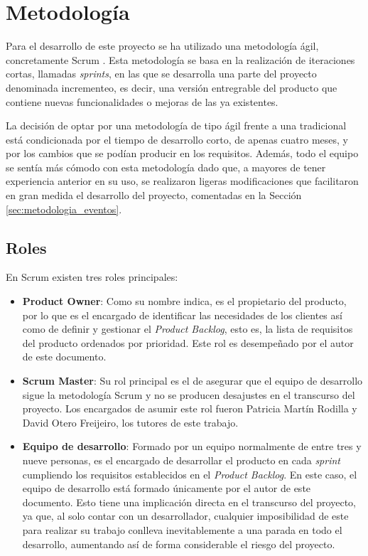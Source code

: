 \chapter{Metodología}
\label{chap:metodologia}

Para el desarrollo de este proyecto se ha utilizado una metodología ágil, concretamente Scrum \cite{scrum}.
Esta metodología se basa en la realización de iteraciones cortas, llamadas \textit{sprints}, en las que se desarrolla una parte del proyecto
denominada incrementeo, es decir, una versión entregrable del producto que contiene
nuevas funcionalidades o mejoras de las ya existentes. 

\bigskip
La decisión de optar por una metodología de tipo ágil frente a una tradicional
está condicionada por el tiempo de desarrollo corto, de apenas cuatro meses, y por los cambios que se podían producir en los requisitos.
Además, todo el equipo se sentía más cómodo con esta metodología dado que, a mayores de tener experiencia anterior en su uso, se realizaron
ligeras modificaciones que facilitaron en gran medida el desarrollo del proyecto, comentadas en la Sección \ref{sec:metodologia_eventos}.

\section{Roles}
\label{sec:metodologia_roles}

En Scrum existen tres roles principales:

\begin{itemize}
		\item \textbf{Product Owner}: Como su nombre indica, es el propietario del producto, por lo que es el encargado de identificar
		las necesidades de los clientes así como de definir y gestionar el \textit{Product Backlog}, esto es, la lista de requisitos del producto ordenados por prioridad.
		Este rol es desempeñado por el autor de este documento.
		\item \textbf{Scrum Master}: Su rol principal es el de asegurar que el equipo de desarrollo sigue la metodología Scrum y no se producen
		desajustes en el transcurso del proyecto. Los encargados de asumir este rol fueron Patricia Martín Rodilla y David Otero Freijeiro, los
		tutores de este trabajo.
		\item \textbf{Equipo de desarrollo}: Formado por un equipo normalmente de entre tres y nueve personas, es el encargado de desarrollar el producto
		en cada \textit{sprint} cumpliendo los requisitos establecidos en el \textit{Product Backlog}. En este caso, el equipo de desarrollo está
		formado únicamente por el autor de este documento. Esto tiene una implicación directa en el transcurso del proyecto, ya que,
		al solo contar con un desarrollador, cualquier imposibilidad de este para realizar su trabajo conlleva inevitablemente a una parada en todo el desarrollo,
		aumentando así de forma considerable el riesgo del proyecto.
\end{itemize}

